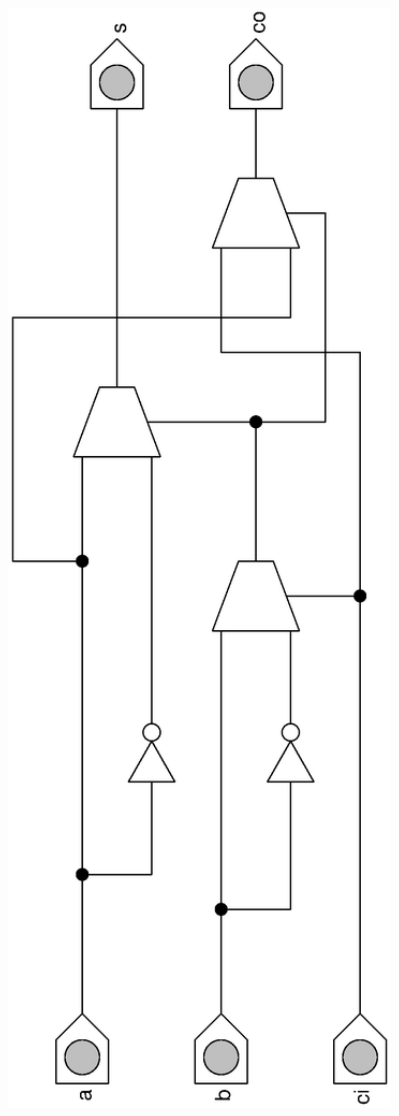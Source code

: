 \documentclass[a4paper,10pt]{scrartcl}
\begin{document}
\begin{enumerate}
        \vspace{-2.5cm}
            \includegraphics[angle=-90,width=0.8\textwidth]{mux2-addierer.eps}
        \vspace{-2.5cm}


\end{enumerate}
\end{document}
